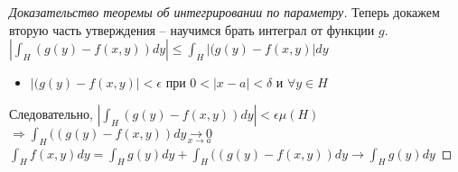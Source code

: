 \begin{proof}[Доказательство теоремы об интегрировании по параметру]
    Теперь докажем вторую часть утверждения -- научимся брать интеграл от функции $g$.\\
    $\displaystyle \left|\int_{H} (g(y) - f(x, y))dy\right| \leqslant
    \int_{H} |(g(y) - f(x, y)|dy$ 
    \begin{itemize}
        \item $ |(g(y) - f(x, y)| < \epsilon$ при $ 0 < |x - a| < \delta$ и $\forall y \in H$
    \end{itemize}
    Следовательно, $\displaystyle \left|\int_{H} (g(y) - f(x, y))dy\right| < \epsilon \mu(H)$ \\
    $\displaystyle \Rightarrow \int_{H} ((g(y) - f(x, y))dy \underset{x \to a}{\to 0}$ \\
    $\displaystyle \int_{H} f(x,y)dy = \int_{H} g(y)dy + \int_{H} ((g(y) - f(x, y))dy 
    \to \int_{H} g(y)dy$ 
\end{proof}

